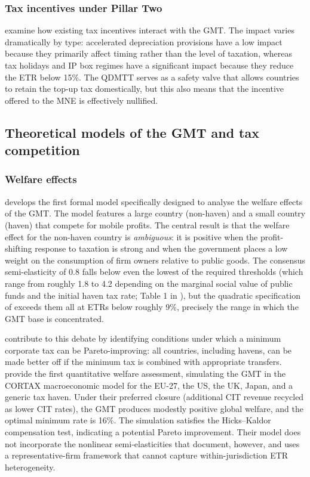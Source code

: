 \documentclass[11pt,a4paper]{article}
\begin{document}
\subsubsection{Tax incentives under Pillar Two}

\citet{ferreiraliotti2022} examine how existing tax incentives interact with the GMT. The impact varies dramatically by type: accelerated depreciation provisions have a low impact because they primarily affect timing rather than the level of taxation, whereas tax holidays and IP box regimes have a significant impact because they reduce the ETR below 15\%. The QDMTT serves as a safety valve that allows countries to retain the top-up tax domestically, but this also means that the incentive offered to the MNE is effectively nullified.

\subsection{Theoretical models of the GMT and tax competition}\label{sec:theory_lit}

\subsubsection{Welfare effects}

\citet{johannesen2022} develops the first formal model specifically designed to analyse the welfare effects of the GMT. The model features a large country (non-haven) and a small country (haven) that compete for mobile profits. The central result is that the welfare effect for the non-haven country is \textit{ambiguous}: it is positive when the profit-shifting response to taxation is strong and when the government places a low weight on the consumption of firm owners relative to public goods. The consensus semi-elasticity of 0.8 falls below even the lowest of the required thresholds (which range from roughly 1.8 to 4.2 depending on the marginal social value of public funds and the initial haven tax rate; Table 1 in \citealp{johannesen2022}), but the quadratic specification of \citet{dowd2017} exceeds them all at ETRs below roughly 9\%, precisely the range in which the GMT base is concentrated.

\citet{hebous2023} contribute to this debate by identifying conditions under which a minimum corporate tax can be Pareto-improving: all countries, including havens, can be made better off if the minimum tax is combined with appropriate transfers. \citet{vantriet2025} provide the first quantitative welfare assessment, simulating the GMT in the CORTAX macroeconomic model for the EU-27, the US, the UK, Japan, and a generic tax haven. Under their preferred closure (additional CIT revenue recycled as lower CIT rates), the GMT produces modestly positive global welfare, and the optimal minimum rate is 16\%. The simulation satisfies the Hicks--Kaldor compensation test, indicating a potential Pareto improvement. Their model does not incorporate the nonlinear semi-elasticities that \citet{dowd2017} document, however, and uses a representative-firm framework that cannot capture within-jurisdiction ETR heterogeneity.
\end{document}

